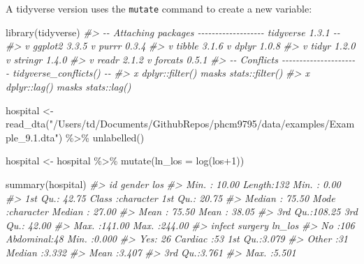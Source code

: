 \documentclass[
]{memoir}
\newenvironment{Shaded}{\begin{snugshade}}{\end{snugshade}}
\newcommand{\AttributeTok}[1]{\textcolor[rgb]{0.77,0.63,0.00}{#1}}
\newcommand{\CommentTok}[1]{\textcolor[rgb]{0.56,0.35,0.01}{\textit{#1}}}
\newcommand{\DecValTok}[1]{\textcolor[rgb]{0.00,0.00,0.81}{#1}}
\newcommand{\FunctionTok}[1]{\textcolor[rgb]{0.00,0.00,0.00}{#1}}
\newcommand{\NormalTok}[1]{#1}
\newcommand{\OtherTok}[1]{\textcolor[rgb]{0.56,0.35,0.01}{#1}}
\newcommand{\SpecialCharTok}[1]{\textcolor[rgb]{0.00,0.00,0.00}{#1}}
\newcommand{\StringTok}[1]{\textcolor[rgb]{0.31,0.60,0.02}{#1}}
\begin{document}
A tidyverse version uses the \texttt{mutate} command to create a new variable:

\begin{Shaded}
\begin{Highlighting}[]
\FunctionTok{library}\NormalTok{(tidyverse)}
\CommentTok{\#\textgreater{} {-}{-} Attaching packages {-}{-}{-}{-}{-}{-}{-}{-}{-}{-}{-}{-}{-}{-}{-}{-}{-}{-}{-} tidyverse 1.3.1 {-}{-}}
\CommentTok{\#\textgreater{} v ggplot2 3.3.5     v purrr   0.3.4}
\CommentTok{\#\textgreater{} v tibble  3.1.6     v dplyr   1.0.8}
\CommentTok{\#\textgreater{} v tidyr   1.2.0     v stringr 1.4.0}
\CommentTok{\#\textgreater{} v readr   2.1.2     v forcats 0.5.1}
\CommentTok{\#\textgreater{} {-}{-} Conflicts {-}{-}{-}{-}{-}{-}{-}{-}{-}{-}{-}{-}{-}{-}{-}{-}{-}{-}{-}{-}{-}{-} tidyverse\_conflicts() {-}{-}}
\CommentTok{\#\textgreater{} x dplyr::filter() masks stats::filter()}
\CommentTok{\#\textgreater{} x dplyr::lag()    masks stats::lag()}

\NormalTok{hospital }\OtherTok{\textless{}{-}} \FunctionTok{read\_dta}\NormalTok{(}\StringTok{"/Users/td/Documents/GithubRepos/phcm9795/data/examples/Example\_9.1.dta"}\NormalTok{) }\SpecialCharTok{\%\textgreater{}\%} 
  \FunctionTok{unlabelled}\NormalTok{()}

\NormalTok{hospital }\OtherTok{\textless{}{-}}\NormalTok{ hospital }\SpecialCharTok{\%\textgreater{}\%} 
  \FunctionTok{mutate}\NormalTok{(}\AttributeTok{ln\_los =} \FunctionTok{log}\NormalTok{(los}\SpecialCharTok{+}\DecValTok{1}\NormalTok{))}

\FunctionTok{summary}\NormalTok{(hospital)}
\CommentTok{\#\textgreater{}        id            gender               los        }
\CommentTok{\#\textgreater{}  Min.   : 10.00   Length:132         Min.   :  0.00  }
\CommentTok{\#\textgreater{}  1st Qu.: 42.75   Class :character   1st Qu.: 20.75  }
\CommentTok{\#\textgreater{}  Median : 75.50   Mode  :character   Median : 27.00  }
\CommentTok{\#\textgreater{}  Mean   : 75.50                      Mean   : 38.05  }
\CommentTok{\#\textgreater{}  3rd Qu.:108.25                      3rd Qu.: 42.00  }
\CommentTok{\#\textgreater{}  Max.   :141.00                      Max.   :244.00  }
\CommentTok{\#\textgreater{}  infect         surgery       ln\_los     }
\CommentTok{\#\textgreater{}  No :106   Abdominal:48   Min.   :0.000  }
\CommentTok{\#\textgreater{}  Yes: 26   Cardiac  :53   1st Qu.:3.079  }
\CommentTok{\#\textgreater{}            Other    :31   Median :3.332  }
\CommentTok{\#\textgreater{}                           Mean   :3.407  }
\CommentTok{\#\textgreater{}                           3rd Qu.:3.761  }
\CommentTok{\#\textgreater{}                           Max.   :5.501}
\end{Highlighting}
\end{Shaded}
\end{document}
